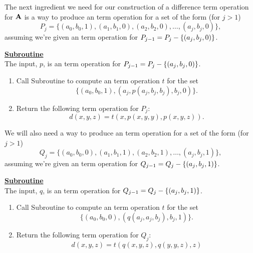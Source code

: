 The next ingredient we need for our construction of a 
difference term operation for $\mathbf{A}$ 
is 
a way to produce an \ld
term operation for a set of the form  (for $j>1$)
\begin{equation*}
P_j = \{(a_0, b_0, 1), (a_1, b_1, 0), (a_2, b_2, 0), \dots, 
(a_j, b_j, 0)\},
\end{equation*}
assuming we're given an \ld term operation for $P_{j-1} = P_{j} - \{(a_j, b_j, 0)\}$.  

\smallskip

\noindent \underline{\bf Subroutine }\\[4pt]
The input, $p$,  is
an \ld term operation for $P_{j-1} = P_{j} - \{(a_j, b_j, 0)\}$.  
\begin{enumerate}[1.]
\item 
Call Subroutine  to 
compute an \ld term operation $t$ for the set
\begin{equation*}
\{(a_0, b_0, 1), (a_j, p(a_j, b_j, b_j), b_j, 0)\}.
\end{equation*}
\item Return the following 
\ld term operation for $P_j$: 
\begin{equation*}
d(x,y,z) = t(x, p(x,y,y), p(x,y,z)).
\end{equation*}
\end{enumerate}

\smallskip

We will also need a way to produce an \ld
term operation for a set of the form  (for $j>1$)
\begin{equation*}
Q_{j} = \{(a_0, b_0, 0), (a_1, b_1, 1), (a_2, b_2, 1), \dots, 
(a_{j}, b_{j}, 1)\},
\end{equation*}
assuming we're given an \ld term operation for 
$Q_{j-1} = Q_j - \{(a_j, b_j, 1)\}$.  

\medskip

\noindent \underline{\bf Subroutine }\\[4pt]
The input, $q$, is an \ld term operation for $Q_{j-1} = Q_j - \{(a_j, b_j, 1)\}$.  
\begin{enumerate}[1.]
\item 
Call Subroutine  to compute an \ld term operation $t$ for the set
\begin{equation*}
\{(a_0, b_0, 0), (q(a_j, a_j, b_j), b_j, 1)\}.
\end{equation*}
\item Return the following 
\ld term operation for $Q_j$: 
\begin{equation*}
d(x,y,z) = t(q(x,y,z), q(y,y,z), z)
\end{equation*}
\end{enumerate}




